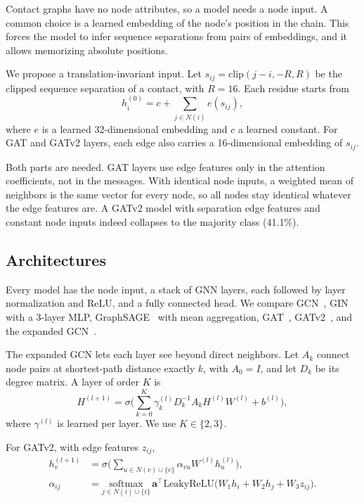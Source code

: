 \documentclass[pdflatex,sn-mathphys-num]{sn-jnl}
\begin{document}
Contact graphs have no node attributes, so a model needs a node input. A common choice is a learned embedding of the node's position in the chain. This forces the model to infer sequence separations from pairs of embeddings, and it allows memorizing absolute positions.

We propose a translation-invariant input. Let $s_{ij} = \mathrm{clip}(j - i, -R, R)$ be the clipped sequence separation of a contact, with $R=16$. Each residue starts from
\begin{equation}
    h_i^{(0)} = c + \sum_{j \in N(i)} e(s_{ij}),
\end{equation}
where $e$ is a learned 32-dimensional embedding and $c$ a learned constant. For GAT and GATv2 layers, each edge also carries a 16-dimensional embedding of $s_{ij}$.

Both parts are needed. GAT layers use edge features only in the attention coefficients, not in the messages. With identical node inputs, a weighted mean of neighbors is the same vector for every node, so all nodes stay identical whatever the edge features are. A GATv2 model with separation edge features and constant node inputs indeed collapses to the majority class (41.1\%).

\subsection{Architectures}

Every model has the node input, a stack of GNN layers, each followed by layer normalization and ReLU, and a fully connected head. We compare GCN~\cite{kipf2017semisupervised}, GIN~\cite{xu2019powerful} with a 3-layer MLP, GraphSAGE~\cite{hamilton2017sage} with mean aggregation, GAT~\cite{veličković2018graph}, GATv2~\cite{brody2022attentivegraphattentionnetworks}, and the expanded GCN~\cite{hashemi2024visiting}.

The expanded GCN lets each layer see beyond direct neighbors. Let $A_k$ connect node pairs at shortest-path distance exactly $k$, with $A_0 = I$, and let $D_k$ be its degree matrix. A layer of order $K$ is
\begin{equation}
    H^{(l+1)} = \sigma\Big( \sum_{k=0}^{K} \gamma_k^{(l)} D_k^{-1} A_k H^{(l)} W^{(l)} + b^{(l)} \Big),
\end{equation}
where $\gamma^{(l)}$ is learned per layer. We use $K \in \{2,3\}$.

For GATv2, with edge features $z_{ij}$,
\begin{align}
    h_v^{(l+1)} &= \sigma\Big( \sum_{u \in N(v) \cup \{v\}} \alpha_{vu} W^{(l)} h_u^{(l)} \Big), \\
    \alpha_{ij} &= \underset{j \in N(i) \cup \{i\}}{\mathrm{softmax}} \, \mathbf{a}^\top \mathrm{LeakyReLU}\big( W_1 h_i + W_2 h_j + W_3 z_{ij} \big).
\end{align}
\end{document}
